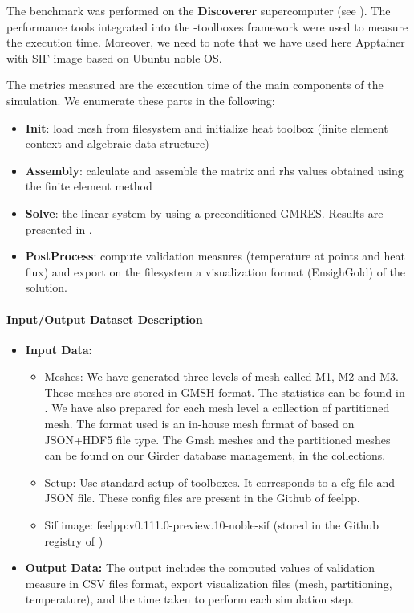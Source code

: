The benchmark was performed on the \textbf{Discoverer} supercomputer (see
).
The performance tools integrated into the \Feelpp-toolboxes framework were used to measure
the execution time.
Moreover, we need to note that we have used here Apptainer with \Feelpp SIF image based on Ubuntu noble OS.

The metrics measured are the execution time of the main components of the simulation. We enumerate these parts in the following:
\begin{itemize}
\item \textbf{Init}: load mesh from filesystem and initialize heat toolbox (finite element context and algebraic data structure)
\item \textbf{Assembly}: calculate and assemble the matrix and rhs values obtained using the finite element method
\item \textbf{Solve}: the linear system by using a preconditioned GMRES. Results
  are presented in .
\item \textbf{PostProcess}: compute validation measures (temperature at points and
  heat flux) and export on the filesystem a visualization format (EnsighGold) of
  the solution.
\end{itemize}

\paragraph{Input/Output Dataset Description}

\begin{itemize}
\item \textbf{Input Data:}
  \begin{itemize}
  \item Meshes: We have generated three levels of mesh called M1, M2
    and M3. These meshes are stored in GMSH format. The statistics can be found in
    . We have also prepared for
    each mesh level a collection of partitioned mesh.
    The format used is an in-house mesh format of \Feelpp based on
    JSON+HDF5 file type.
    The Gmsh meshes and the partitioned meshes can be found on our Girder
    database management, in the \Feelpp collections.
  \item Setup: Use standard setup of \Feelpp toolboxes. It corresponds to a cfg
    file and JSON file. These config files are present in the Github of feelpp.
  \item Sif image: feelpp:v0.111.0-preview.10-noble-sif  (stored in the Github registry of \Feelpp)
  \end{itemize}
\item \textbf{Output Data:} The output includes the computed values of
  validation measure in CSV files format, export visualization files (mesh, partitioning, temperature), and the time taken to perform each simulation step.
\end{itemize}



